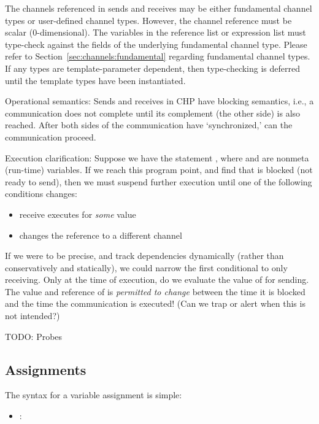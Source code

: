 The channels referenced in sends and receives may be 
either fundamental channel types or user-defined channel types.  
However, the channel reference must be scalar (0-dimensional).  
The variables in the reference list or expression list must type-check
against the fields of the underlying fundamental channel type.  
Please refer to Section~\ref{sec:channels:fundamental} 
regarding fundamental channel types.  
If any types are template-parameter dependent, then type-checking
is deferred until the template types have been instantiated.  

Operational semantics:
Sends and receives in CHP have blocking semantics, i.e., 
a communication does not complete until its complement (the other side)
is also reached.  
After both sides of the communication have `synchronized,'
can the communication proceed.  

Execution clarification:
Suppose we have the statement , where  and 
are nonmeta (run-time) variables.  
If we reach this program point, and find that  is blocked
(not ready to send), then we must suspend further execution until
one of the following conditions changes:
\begin{itemize}
\item {} receive executes for \emph{some} value 
\item {} changes the reference to a different channel
\end{itemize}
If we were to be precise, and track dependencies dynamically 
(rather than conservatively and statically), 
we could narrow the first conditional to only  receiving.  
Only at the time of execution,
do we evaluate the value of  for sending.  
The value and reference of  is \emph{permitted to change} between
the time it is blocked and the time the communication is executed!
(Can we trap or alert when this is not intended?)

TODO: Probes

\subsection{Assignments}
\label{sec:chp:stmts:assign}

The syntax for a variable assignment is simple:

\begin{itemize}
\item {} :  \assign\ 
\end{itemize}

